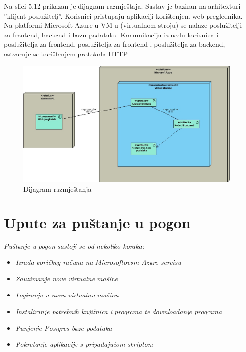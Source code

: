 			 Na slici 5.12 prikazan je dijagram razmještaja. Sustav je baziran na arhitekturi ”klijent-poslužitelj”. Korisnici pristupaju aplikaciji korištenjem web preglednika. Na platformi Microsoft Azure u VM-u (virtualnom stroju) se nalaze poslužitelji za frontend, backend i bazu podataka. Komunikacija između korisnika i poslužitelja za frontend, poslužitelja za frontend i poslužitelja za backend, ostvaruje se korištenjem protokola HTTP.
			 
			 
			 
			 \begin{figure}[H]
			            \includegraphics[width=\textwidth]{slike/dijagram razmjeÅ¡taja(1).vpd.jpg} %
			          \caption{Dijagram razmještanja}
			            \label{fig:dijagram_razmjestanja} %
		      \end{figure}
			
			\eject 
		
		\section{Upute za puštanje u pogon}
				
			 \textit{Puštanje u pogon sastoji se od nekoliko koraka:}
    \begin{itemize}
		\item 	\textit{Izrada koričkog računa na Microsoftovom Azure servisu}
		\item 	\textit{Zauzimanje nove virtualne mašine}
		\item 	\textit{Logiranje u novu virtualnu mašinu}
		\item 	\textit{Instaliranje potrebnih knjižnica i programa te downloadanje programa}
		\item 	\textit{Punjenje Postgres baze podataka}
		\item 	\textit{Pokretanje aplikacije s pripadajućom skriptom}
	\end{itemize}

